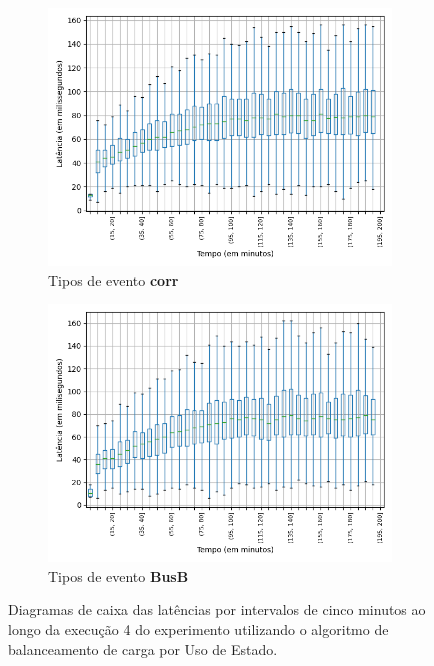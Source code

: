 \begin{figure}
\begin{subfigure}{.5\textwidth}
\centering
\includegraphics[width=\textwidth]{figuras/graphics/boxplot_9-dez-su_corr.png}
\caption{Tipos de evento \textbf{corr}}
\label{fig:BoxPlot_corr_SU_9-dez-su}
\end{subfigure}%
\begin{subfigure}{.5\textwidth}
\centering
\includegraphics[width=\textwidth]{figuras/graphics/boxplot_9-dez-su_busb.png}
\caption{Tipos de evento \textbf{BusB}}
\label{fig:BoxPlot_BusB_SU_9-dez-su}
\end{subfigure}%
\caption{Diagramas de caixa das latências por intervalos de cinco minutos ao longo da execução 4 do experimento utilizando o algoritmo de balanceamento de carga por Uso de Estado.}
\end{figure}






